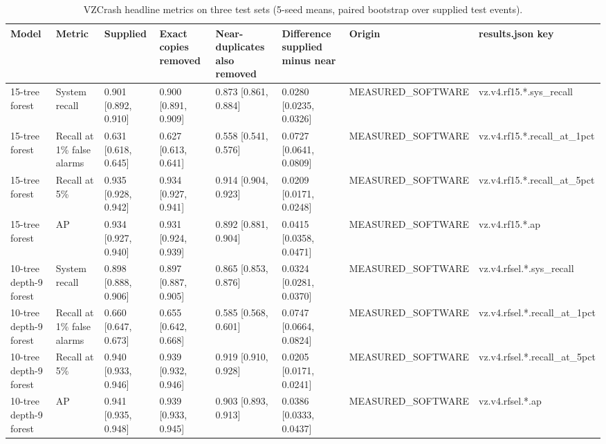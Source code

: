 \begin{table}[t]
\centering
\small
\caption{VZCrash headline metrics on three test sets (5-seed means, paired bootstrap over supplied test events).}
\label{tab:jp_tab_vz_leakage}
\begin{tabular}{llllllll}
\toprule
Model & Metric & Supplied & Exact copies removed & Near-duplicates also removed & Difference supplied minus near & Origin & results.json key \\
\midrule
15-tree forest & System recall & 0.901 [0.892, 0.910] & 0.900 [0.891, 0.909] & 0.873 [0.861, 0.884] & 0.0280 [0.0235, 0.0326] & MEASURED\_SOFTWARE & vz.v4.rf15.*.sys\_recall \\
15-tree forest & Recall at 1\% false alarms & 0.631 [0.618, 0.645] & 0.627 [0.613, 0.641] & 0.558 [0.541, 0.576] & 0.0727 [0.0641, 0.0809] & MEASURED\_SOFTWARE & vz.v4.rf15.*.recall\_at\_1pct \\
15-tree forest & Recall at 5\% & 0.935 [0.928, 0.942] & 0.934 [0.927, 0.941] & 0.914 [0.904, 0.923] & 0.0209 [0.0171, 0.0248] & MEASURED\_SOFTWARE & vz.v4.rf15.*.recall\_at\_5pct \\
15-tree forest & AP & 0.934 [0.927, 0.940] & 0.931 [0.924, 0.939] & 0.892 [0.881, 0.904] & 0.0415 [0.0358, 0.0471] & MEASURED\_SOFTWARE & vz.v4.rf15.*.ap \\
10-tree depth-9 forest & System recall & 0.898 [0.888, 0.906] & 0.897 [0.887, 0.905] & 0.865 [0.853, 0.876] & 0.0324 [0.0281, 0.0370] & MEASURED\_SOFTWARE & vz.v4.rfsel.*.sys\_recall \\
10-tree depth-9 forest & Recall at 1\% false alarms & 0.660 [0.647, 0.673] & 0.655 [0.642, 0.668] & 0.585 [0.568, 0.601] & 0.0747 [0.0664, 0.0824] & MEASURED\_SOFTWARE & vz.v4.rfsel.*.recall\_at\_1pct \\
10-tree depth-9 forest & Recall at 5\% & 0.940 [0.933, 0.946] & 0.939 [0.932, 0.946] & 0.919 [0.910, 0.928] & 0.0205 [0.0171, 0.0241] & MEASURED\_SOFTWARE & vz.v4.rfsel.*.recall\_at\_5pct \\
10-tree depth-9 forest & AP & 0.941 [0.935, 0.948] & 0.939 [0.933, 0.945] & 0.903 [0.893, 0.913] & 0.0386 [0.0333, 0.0437] & MEASURED\_SOFTWARE & vz.v4.rfsel.*.ap \\
\bottomrule
\end{tabular}
\end{table}
